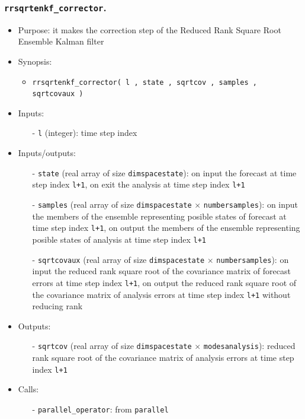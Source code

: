 \documentclass[12pt]{article}
\begin{document}
\subsubsection{{\tt rrsqrtenkf\_corrector}.}
\begin{itemize}
\item Purpose: it makes the correction step of the Reduced Rank Square Root Ensemble Kalman filter
\item Synopsis: 
\begin{itemize}
\item {\tt rrsqrtenkf\_corrector( l , state , sqrtcov , samples , sqrtcovaux )} 
\end{itemize}
\item Inputs: 
\begin{itemize}
\item[-] {\tt l} (integer): time step index
\end{itemize}
\item Inputs/outputs: 
\begin{itemize}
\item[-] {\tt state} (real array of size {\tt dimspacestate}): on input the forecast at time step index {\tt l+1}, on exit the analysis at time step index {\tt l+1}
\item[-] {\tt samples} (real array of size {\tt dimspacestate} $\times$ {\tt numbersamples}): on input the members of the ensemble representing posible states of forecast at time step index {\tt l+1}, on output the members of the ensemble representing posible states of analysis at time step index {\tt l+1}
\item[-] {\tt sqrtcovaux} (real array of size {\tt dimspacestate} $\times$ {\tt numbersamples}): on input the reduced rank square root of the covariance matrix of forecast errors at time step index {\tt l+1}, on output the reduced rank square root of the covariance matrix of analysis errors at time step index {\tt l+1} without reducing rank
\end{itemize}
\item Outputs: 
\begin{itemize}
\item[-] {\tt sqrtcov} (real array of size {\tt dimspacestate} $\times$ {\tt modesanalysis}): reduced rank square root of the covariance matrix of analysis errors at time step index {\tt l+1}
\end{itemize}
\item Calls: 
\begin{itemize}
\item[-] {\tt parallel\_operator}: from {\tt parallel}

\end{itemize}
\end{itemize}
\end{document}
